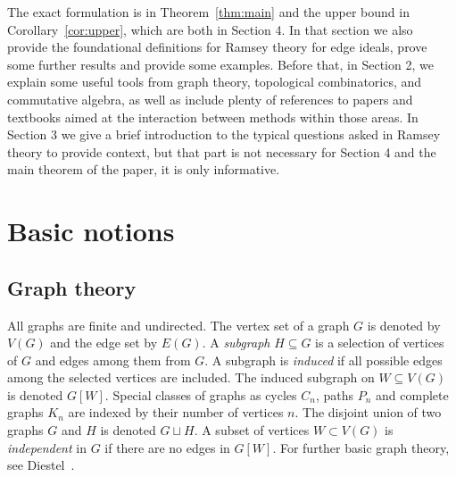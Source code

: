 \documentclass{article}
\theoremstyle{plain}
\theoremstyle{definition}
\begin{document}
The exact formulation is in Theorem~\ref{thm:main} and the upper bound in Corollary~\ref{cor:upper}, which are both in Section 4. In that section we also provide the foundational definitions for Ramsey theory for edge ideals, prove some further results and provide some examples. Before that, in Section 2, we explain some useful tools from graph theory, topological combinatorics, and commutative algebra, as well as include plenty of references to papers and textbooks aimed at the interaction between methods within those areas. In Section 3 we give a brief introduction to the typical questions asked in Ramsey theory to provide context, but that part is not necessary for Section 4 and the main theorem of the paper, it is only informative.

\section{Basic notions}

\subsection{Graph theory}
All graphs are finite and undirected. The vertex set of a graph $G$ is denoted by $V(G)$ and the edge set by $E(G)$. A \emph{subgraph} $H \subseteq G$ is a selection of vertices of $G$ and edges among them from $G.$ A subgraph is \emph{induced} if all possible edges among the selected vertices are included. The induced subgraph on $W \subseteq V(G)$ is denoted $G[W].$ Special classes of graphs as cycles $C_n$, paths $P_n$ and complete graphs $K_n$ are indexed by their number of vertices $n.$ The disjoint union of two graphs $G$ and $H$ is denoted $G \sqcup H.$ A subset of vertices $W\subset V(G)$ is \emph{independent} in $G$ if there are no edges in $G[W]$. For further basic graph theory, see Diestel~\cite{diestel2025}.
\end{document}

